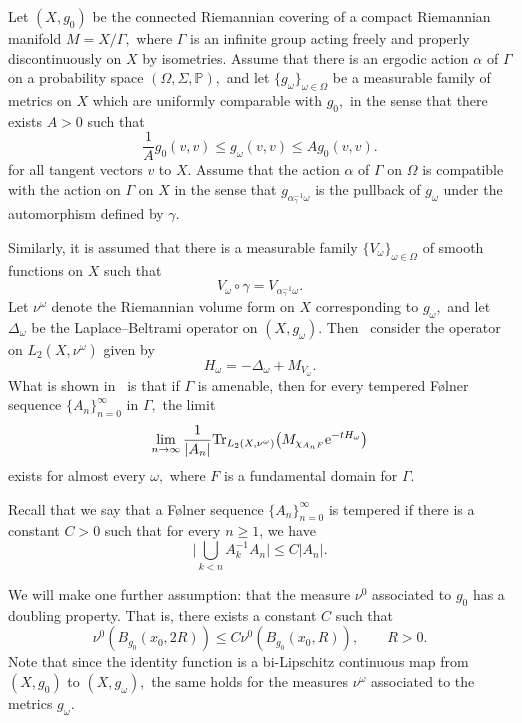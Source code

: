 \documentclass[pdftex]{sigma}
\numberwithin{equation}{section}
\begin{document}
\begin{Example}
 Let $(X,g_0)$ be the connected Riemannian covering of a compact Riemannian manifold $M = X/\Gamma,$ where $\Gamma$ is an infinite group acting freely and properly discontinuously on $X$ by isometries. Assume that there is an ergodic action $\alpha$ of $\Gamma$ on a probability space $(\Omega,\Sigma,\mathbb{P}),$ and let $\{g_\omega\}_{\omega\in \Omega}$ be a measurable family of metrics on $X$ which are uniformly comparable with $g_0,$ in the sense that there exists $A>0$ such that
 \[
 \frac1A g_0(v,v) \leq g_\omega(v,v)\leq Ag_0(v,v).
 \]
 for all tangent vectors $v$ to $X.$ Assume that the action $\alpha$ of $\Gamma$ on $\Omega$ is compatible with the action on $\Gamma$ on $X$ in the sense that $g_{\alpha_{\gamma}^{-1}\omega}$ is the pullback of $g_{\omega}$ under the automorphism defined by $\gamma.$

 Similarly, it is assumed that there is a measurable family $\{V_{\omega}\}_{\omega\in \Omega}$ of smooth functions on $X$ such that
 \[
 V_{\omega}\circ \gamma = V_{\alpha^{-1}_\gamma\omega}.
 \]
 Let $\nu^\omega$ denote the Riemannian volume form on $X$ corresponding to $g_{\omega},$ and let $\Delta_{\omega}$ be the Laplace--Beltrami operator on $(X,g_{\omega}).$ Then~\cite{LenzPeyerimhoffVeselic2007} consider the operator on $L_2(X,\nu^{\omega})$ given by
 \[
 H_{\omega} = -\Delta_{\omega}+M_{V_\omega}.
 \]
 What is shown in~\cite[equation~(27)]{LenzPeyerimhoffVeselic2007} is that if $\Gamma$ is amenable, then for every tempered F{\o}lner sequence $\{A_n\}_{n=0}^\infty$ in $\Gamma,$ the limit
 \[
 \lim_{n\to\infty} \frac{1}{|A_n|}\mathrm{Tr}_{L_2(X,\nu^{\omega})}\big(M_{\chi_{A_nF}}{\rm e}^{-tH_{\omega}}\big)
 \]
 exists for almost every $\omega,$ where $F$ is a fundamental domain for $\Gamma.$

 Recall that we say that a F{\o}lner sequence $\{A_n\}_{n=0}^\infty$ is tempered if there is a constant $C>0$ such that for every $n\geq 1$, we have
 \[
 \bigg|\bigcup_{k<n} A_k^{-1}A_{n}\bigg| \leq C|A_{n}|.
 \]
\end{Example}

We will make one further assumption: that the measure $\nu^{0}$ associated to $g_0$ has a doubling property. That is, there exists a constant $C$ such that
\[
 \nu^0(B_{g_{0}}(x_0,2R)) \leq C\nu^{0}(B_{g_{0}}(x_0,R)),\qquad R>0.
\]
Note that since the identity function is a bi-Lipschitz continuous map from $(X,g_0)$ to $(X,g_{\omega}),$ the same holds for the measures $\nu^{\omega}$ associated to the metrics $g_{\omega}.$
\end{document}
